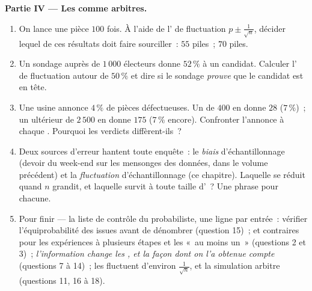 \begin{problem}
\medskip
\noindent\textbf{Partie IV --- Les  comme arbitres.}
\begin{enumerate}[resume]
  \item On lance une pièce $100$ fois. À l'aide de l' de
        fluctuation $p \pm \frac{1}{\sqrt n}$, décider lequel de ces
        résultats doit faire sourciller~: $55$ piles~; $70$ piles.
  \item Un sondage auprès de $1\,000$ électeurs donne $52\,\%$ à un
        candidat. Calculer l' de fluctuation autour de
        $50\,\%$ et dire si le sondage \emph{prouve} que le
        candidat est en tête.
  \item Une usine annonce $4\,\%$ de pièces défectueuses. Un
         de $400$ en donne $28$ ($7\,\%$)~; un
         ultérieur de $2\,500$ en donne $175$ ($7\,\%$
        encore). Confronter l'annonce à chaque .
        Pourquoi les verdicts diffèrent-ils~?
  \item Deux sources d'erreur hantent toute enquête~: le
        \emph{biais} d'échantillonnage (devoir du week-end sur les
        mensonges des données, dans le volume précédent) et la
        \emph{fluctuation} d'échantillonnage (ce chapitre). Laquelle
        se réduit quand $n$ grandit, et laquelle survit à toute
        taille d'~? Une phrase pour chacune.
  \item Pour finir --- la liste de contrôle du probabiliste, une
        ligne par entrée~: vérifier l'équiprobabilité des issues
        avant de dénombrer (question 15)~;  et 
        contraires pour les expériences à plusieurs étapes et les
        «~au moins un~» (questions 2 et 3)~; \emph{l'information
        change les , et la façon dont on l'a obtenue
        compte} (questions 7 à 14)~; les  fluctuent
        d'environ $\frac{1}{\sqrt n}$, et la simulation arbitre
        (questions 11, 16 à 18).
\end{enumerate}
\end{problem}
